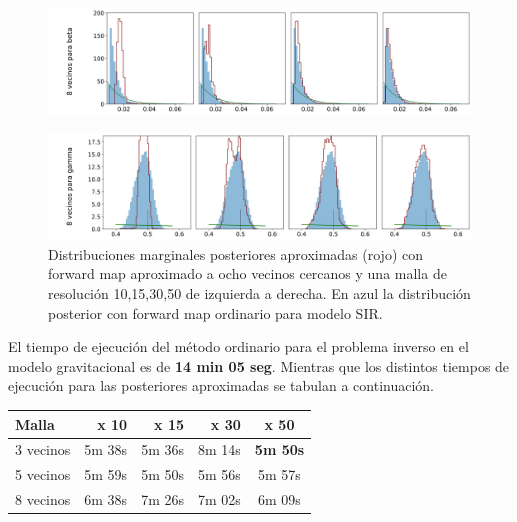 \begin{figure}[H] 
    \centering 
    \includegraphics[width = 17 cm ]{img/Exp_Central_SIR_Sigma/Figuras/Generales/Convergencia_theta1_3_SIR_sigma.png} 
\end{figure} 
\begin{figure}[H] 
    \centering 
    \includegraphics[width = 17 cm ]{img/Exp_Central_SIR_Sigma/Figuras/Generales/Convergencia_theta2_3_SIR_sigma.png} 
    \caption{Distribuciones marginales posteriores aproximadas (rojo) con forward map aproximado a ocho vecinos cercanos y una malla de resolución 10,15,30,50 de izquierda a derecha. En azul la distribución posterior con forward map ordinario para modelo SIR.}
    \label{Fig. Aprox SIR 8v}
\end{figure} 


El tiempo de ejecución del método ordinario para el problema inverso en el modelo gravitacional es de \textbf{14 min 05 seg}. Mientras que los distintos tiempos de ejecución para las posteriores aproximadas se tabulan a continuación.

\begin{table}[H]
    \centering
    \begin{tabular}{l r r r c}
      \toprule
       \textbf{Malla} & \textbf{\:\:\:\:\:\:\:10 x 10\:\:\:\:\:\:\:} & \textbf{\:\:\:\:\:\:\:15 x 15\:\:\:\:\:\:\:} & \textbf{\:\:\:\:\:\:\:30 x 30\:\:\:\:\:\:\:} & \textbf{\:\:\:\:\:\:\:50 x 50\:\:\:\:\:\:\:} \\
      \midrule
      3 vecinos & 5m 38s & 5m 36s & 8m 14s & \textbf{5m 50s}\\
      5 vecinos & 5m 59s & 5m 50s & 5m 56s & 5m 57s\\
      8 vecinos & 6m 38s & 7m 26s & 7m 02s & 6m 09s\\
      \bottomrule
    \end{tabular}
\end{table}

